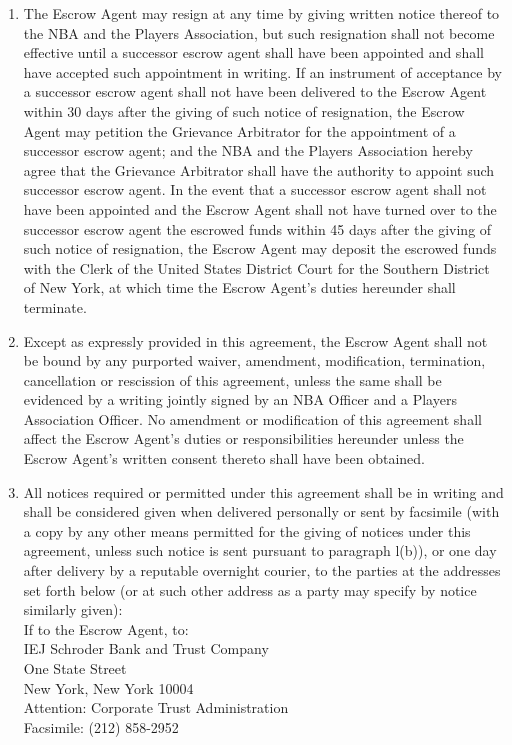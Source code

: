 \documentclass[
]{book}
\begin{document}
\begin{enumerate}
\item
  The Escrow Agent may resign at any time by giving written notice thereof to the NBA and the Players Association, but such resignation shall not become effective until a successor escrow agent shall have been appointed and shall have accepted such appointment in writing. If an instrument of acceptance by a successor escrow agent shall not have been delivered to the Escrow Agent within 30 days after the giving of such notice of resignation, the Escrow Agent may petition the Grievance Arbitrator for the appointment of a successor escrow agent; and the NBA and the Players Association hereby agree that the Grievance Arbitrator shall have the authority to appoint such successor escrow agent. In the event that a successor escrow agent shall not have been appointed and the Escrow Agent shall not have turned over to the successor escrow agent the escrowed funds within 45 days after the giving of such notice of resignation, the Escrow Agent may deposit the escrowed funds with the Clerk of the United States District Court for the Southern District of New York, at which time the Escrow Agent's duties hereunder shall terminate.
\item
  Except as expressly provided in this agreement, the Escrow Agent shall not be bound by any purported waiver, amendment, modification, termination, cancellation or rescission of this agreement, unless the same shall be evidenced by a writing jointly signed by an NBA Officer and a Players Association Officer. No amendment or modification of this agreement shall affect the Escrow Agent's duties or responsibilities hereunder unless the Escrow Agent's written consent thereto shall have been obtained.
\item
  All notices required or permitted under this agreement shall be in writing and shall be considered given when delivered personally or sent by facsimile (with a copy by any other means permitted for the giving of notices under this agreement, unless such notice is sent pursuant to paragraph l(b)), or one day after delivery by a reputable overnight courier, to the parties at the addresses set forth below (or at such other address as a party may specify by notice similarly given):\\
  If to the Escrow Agent, to:\\
  IEJ Schroder Bank and Trust Company\\
  One State Street\\
  New York, New York 10004\\
  Attention: Corporate Trust Administration\\
  Facsimile: (212) 858-2952


\end{enumerate}
\end{document}
